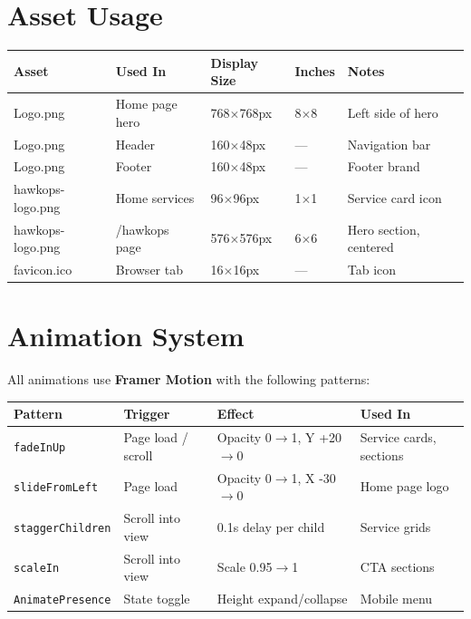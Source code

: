 \documentclass[11pt,a4paper]{article}
\begin{document}
\newpage

\section{Asset Usage}

\begin{center}
\begin{tabularx}{\textwidth}{llllX}
\toprule
\textbf{Asset} & \textbf{Used In} & \textbf{Display Size} & \textbf{Inches} & \textbf{Notes} \\
\midrule
Logo.png & Home page hero & 768$\times$768px & 8$\times$8 & Left side of hero \\
Logo.png & Header & 160$\times$48px & --- & Navigation bar \\
Logo.png & Footer & 160$\times$48px & --- & Footer brand \\
hawkops-logo.png & Home services & 96$\times$96px & 1$\times$1 & Service card icon \\
hawkops-logo.png & /hawkops page & 576$\times$576px & 6$\times$6 & Hero section, centered \\
favicon.ico & Browser tab & 16$\times$16px & --- & Tab icon \\
\bottomrule
\end{tabularx}
\end{center}

\section{Animation System}

All animations use \textbf{Framer Motion} with the following patterns:

\begin{tabularx}{\textwidth}{lllX}
\toprule
\textbf{Pattern} & \textbf{Trigger} & \textbf{Effect} & \textbf{Used In} \\
\midrule
\texttt{fadeInUp} & Page load / scroll & Opacity 0$\to$1, Y +20$\to$0 & Service cards, sections \\
\texttt{slideFromLeft} & Page load & Opacity 0$\to$1, X -30$\to$0 & Home page logo \\
\texttt{staggerChildren} & Scroll into view & 0.1s delay per child & Service grids \\
\texttt{scaleIn} & Scroll into view & Scale 0.95$\to$1 & CTA sections \\
\texttt{AnimatePresence} & State toggle & Height expand/collapse & Mobile menu \\
\bottomrule
\end{tabularx}
\end{document}
